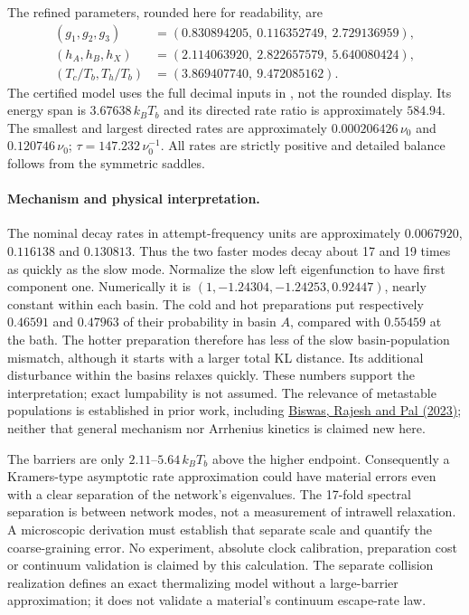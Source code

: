 \documentclass[11pt]{article}
\begin{document}
The refined parameters, rounded here for readability, are
\[
\begin{split}
(g_1,g_2,g_3)&=(0.830894205,\ 0.116352749,\ 2.729136959),\\
(h_A,h_B,h_X)&=(2.114063920,\ 2.822657579,\ 5.640080424),\\
(T_c/T_b,T_h/T_b)&=(3.869407740,\ 9.472085162).
\end{split}
\]
The certified model uses the full decimal inputs in
, not the rounded display.
Its energy span is $3.67638\,k_BT_b$ and its directed rate ratio is
approximately $584.94$. The smallest and largest directed rates are
approximately $0.000206426\,\nu_0$ and $0.120746\,\nu_0$;
$\tau=147.232\,\nu_0^{-1}$. All rates are strictly positive and detailed
balance follows from the symmetric saddles.

\paragraph{Mechanism and physical interpretation.}
The nominal decay rates in attempt-frequency units are approximately
$0.0067920$, $0.116138$ and $0.130813$. Thus the two faster modes decay
about 17 and 19 times as quickly as the slow mode.
Normalize the slow left eigenfunction to have first component one.
Numerically it is $(1,-1.24304,-1.24253,0.92447)$, nearly constant within
each basin. The cold and hot preparations put respectively $0.46591$
and $0.47963$ of their probability in basin $A$, compared with $0.55459$
at the bath. The hotter preparation therefore has less of the slow
basin-population mismatch, although it starts with a larger total KL
distance. Its additional disturbance within the basins relaxes quickly.
These numbers support the interpretation; exact lumpability is not assumed.
The relevance of metastable populations is established in prior work,
including \href{https://arxiv.org/abs/2304.06420}{Biswas, Rajesh and Pal (2023)};
neither that general mechanism nor Arrhenius kinetics is claimed new here.

The barriers are only $2.11$--$5.64\,k_BT_b$ above the higher endpoint.
Consequently a Kramers-type asymptotic rate approximation could have
material errors even with a clear separation of the network's eigenvalues.
The 17-fold spectral separation is between network modes, not a measurement
of intrawell relaxation. A microscopic derivation must establish that
separate scale and quantify the coarse-graining error. No experiment,
absolute clock calibration, preparation cost or continuum validation is
claimed by this calculation.
The separate collision realization defines an exact thermalizing model
without a large-barrier approximation; it does not validate a material's
continuum escape-rate law.
\end{document}

